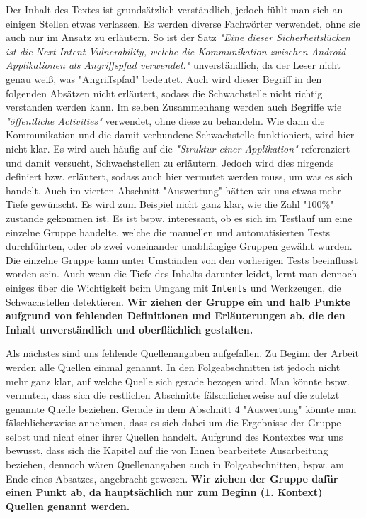 \documentclass{article}
\begin{document}
  Der Inhalt des Textes ist grundsätzlich verständlich, jedoch fühlt man sich an
  einigen Stellen etwas verlassen. Es werden diverse Fachwörter verwendet, ohne
  sie auch nur im Ansatz zu erläutern. So ist der Satz \textit{"Eine dieser
  Sicherheitslücken ist die Next-Intent Vulnerability, welche die Kommunikation
  zwischen Android Applikationen als Angriffspfad verwendet."} unverständlich,
  da der Leser nicht genau weiß, was "Angriffspfad" bedeutet. Auch wird dieser
  Begriff in den folgenden Absätzen nicht erläutert, sodass die Schwachstelle
  nicht richtig verstanden werden kann. Im selben Zusammenhang werden auch
  Begriffe wie \textit{"öffentliche Activities"} verwendet, ohne diese zu
  behandeln. Wie dann die Kommunikation und die damit verbundene Schwachstelle
  funktioniert, wird hier nicht klar. Es wird auch häufig auf die
  \textit{"Struktur einer Applikation"} referenziert und damit versucht,
  Schwachstellen zu erläutern. Jedoch wird dies nirgends definiert bzw.
  erläutert, sodass auch hier vermutet werden muss, um was es sich handelt.
  Auch im vierten Abschnitt "Auswertung" hätten wir uns etwas mehr Tiefe
  gewünscht. Es wird zum Beispiel nicht ganz klar, wie die Zahl "100\%" zustande
  gekommen ist. Es ist bspw. interessant, ob es sich im Testlauf um eine einzelne
  Gruppe handelte, welche die manuellen und automatisierten Tests durchführten,
  oder ob zwei voneinander unabhängige Gruppen gewählt wurden. Die einzelne
  Gruppe kann unter Umständen von den vorherigen Tests beeinflusst worden sein.
  Auch wenn die Tiefe des Inhalts darunter leidet, lernt man dennoch einiges
  über die Wichtigkeit beim Umgang mit \texttt{Intents} und Werkzeugen, die
  Schwachstellen detektieren.  \textbf{Wir ziehen der Gruppe ein und halb Punkte
  aufgrund von fehlenden Definitionen und Erläuterungen ab, die den Inhalt
  unverständlich und oberflächlich gestalten.}

  Als nächstes sind uns fehlende Quellenangaben aufgefallen. Zu Beginn der
  Arbeit werden alle Quellen einmal genannt. In den Folgeabschnitten ist jedoch
  nicht mehr ganz klar, auf welche Quelle sich gerade bezogen wird. Man könnte
  bspw. vermuten, dass sich die restlichen Abschnitte fälschlicherweise auf die
  zuletzt genannte Quelle beziehen. Gerade in dem Abschnitt 4 "Auswertung"
  könnte man fälschlicherweise annehmen, dass es sich dabei um die Ergebnisse der 
 Gruppe selbst und nicht einer ihrer Quellen handelt. Aufgrund des Kontextes war uns 
 bewusst, dass sich die Kapitel auf die von Ihnen bearbeitete Ausarbeitung beziehen, 
 dennoch wären Quellenangaben auch in Folgeabschnitten, bspw. am Ende eines Absatzes,
 angebracht gewesen. \textbf{Wir ziehen der Gruppe dafür einen Punkt ab, da hauptsächlich 
nur zum Beginn (1. Kontext) Quellen genannt werden.}
\end{document}
